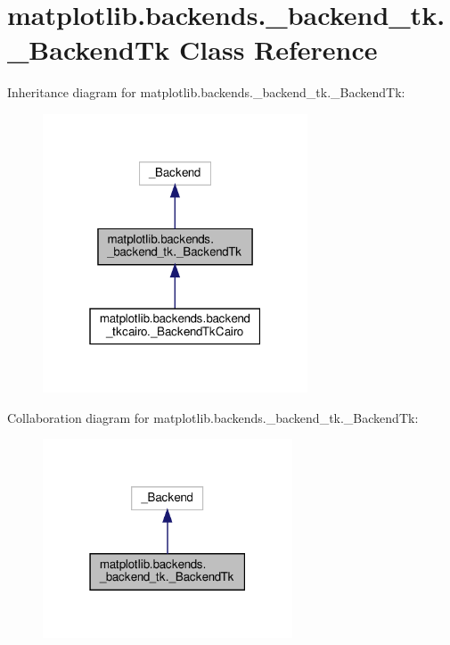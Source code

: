 \hypertarget{classmatplotlib_1_1backends_1_1__backend__tk_1_1__BackendTk}{}\section{matplotlib.\+backends.\+\_\+backend\+\_\+tk.\+\_\+\+Backend\+Tk Class Reference}
\label{classmatplotlib_1_1backends_1_1__backend__tk_1_1__BackendTk}


Inheritance diagram for matplotlib.\+backends.\+\_\+backend\+\_\+tk.\+\_\+\+Backend\+Tk\+:
\nopagebreak
\begin{figure}[H]
\begin{center}
\leavevmode
\includegraphics[width=223pt]{classmatplotlib_1_1backends_1_1__backend__tk_1_1__BackendTk__inherit__graph}
\end{center}
\end{figure}


Collaboration diagram for matplotlib.\+backends.\+\_\+backend\+\_\+tk.\+\_\+\+Backend\+Tk\+:
\nopagebreak
\begin{figure}[H]
\begin{center}
\leavevmode
\includegraphics[width=210pt]{classmatplotlib_1_1backends_1_1__backend__tk_1_1__BackendTk__coll__graph}
\end{center}
\end{figure}

